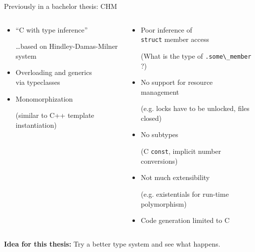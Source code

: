 \documentclass[aspectratio=169]{beamer}
\newcommand{\li}[1]{\lstinline{#1}}
\def\smll{\scriptsize}
\begin{document}
\begin{frame}{Previously in a bachelor thesis: CHM}
\begin{columns}
\begin{column}{.5\linewidth}
  \begin{itemize}\small
  \item[\color{blue!66}\faArrowRight] ``C with type inference'' \\{\smll\dots based on \alert<3>{Hindley-Damas-Milner system}\par}
  \item[\color{blue!66}\faArrowRight] Overloading and generics \\ via typeclasses
  \item[\color{blue!66}\faArrowRight] Monomorphization \\{\smll(similar to C++ template instantiation)\par}
  \end{itemize}
\end{column}\pause%
\begin{column}{.5\linewidth}
  \begin{itemize}\small
  \item[\color{red}\faTimes] Poor inference of \\ \texttt{struct} member access \\ {\smll(What is the type of \li{.some\_member} ?)\par}
  \item[\color{red}\faTimes] No support for resource management \\{\smll(e.g. locks have to be unlocked, files closed)\par}
  \item[\color{red}\faTimes] No subtypes \\{\smll (C \li{const}, implicit number conversions)\par}
  \item[\color{red}\faTimes] Not much extensibility \\{\smll(e.g. existentials for run-time polymorphism)\par}
  \item[\color{red}\faTimes] Code generation limited to C 
  \end{itemize}
\end{column}
\end{columns}

\vspace{3ex}
\pause\textbf{Idea for this thesis:} Try a \alert{better type system} and see what happens.
\end{frame}
\end{document}
